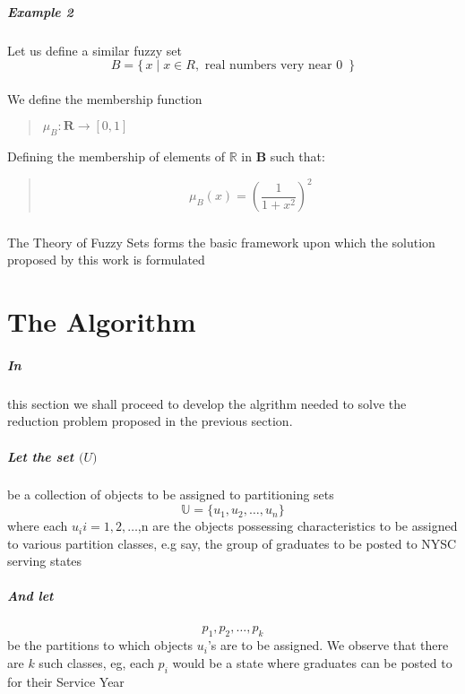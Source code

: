 \documentclass[a4paper]{book}
\begin{document}
				\paragraph{Example 2}
					Let us define a similar fuzzy set 
					\[
					B = \{\, x \mid x \in R, \text{ real numbers very near 0 } \,\}
					\]
					\\We define the membership function\\
					\begin{verse}
						$\mu_B\colon \textbf{R} \to [0,1] $
					\end{verse}
					Defining the membership of elements of $\mathbb{R}$ in $\mathbf{B}$ such that:
					\begin{verse}
						\begin{equation}
							\mu_B(x) = \left( \frac{1}{1+x^2} \right)^{2}
						\end{equation}
					\end{verse}
				\paragraph{}
					The Theory of Fuzzy Sets forms the basic framework upon which the solution proposed by this work is formulated
	\chapter{The Algorithm}
		\paragraph{In}
			this section we shall proceed to develop the algrithm needed to solve the reduction problem proposed in the previous section.
		\paragraph{Let the set $\mathbb(U)$} be a collection of objects to be assigned to partitioning sets
			\begin{equation}
				\mathbb{U} = \{u_1, u_2,\dots,u_n\}				
			\end{equation}
			where each $u_i i=1,2,\dots$,n are the objects possessing characteristics to be assigned to various partition classes, e.g say, the group of graduates to be posted to NYSC serving states
		\paragraph{And let}
		\begin{equation}
			p_1,p_2,\dots,p_k
		\end{equation}
			be the partitions to which objects $u_i$'s are to be assigned. We observe that there are $k$ such classes, eg, each $p_i$ would be a state where graduates can be posted to for their Service Year
\end{document}
